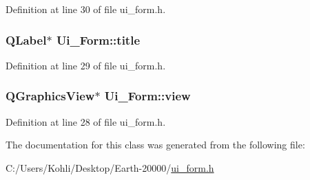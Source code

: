Definition at line 30 of file ui\_\-form.h.\hypertarget{class_ui___form_a01632f0f69b650c6b495e36b16f6922d}{
\subsubsection[{title}]{\setlength{\rightskip}{0pt plus 5cm}QLabel$\ast$ {\bf Ui\_\-Form::title}}}
\label{class_ui___form_a01632f0f69b650c6b495e36b16f6922d}


Definition at line 29 of file ui\_\-form.h.\hypertarget{class_ui___form_a2dd20604b10943cf669cddf4ad73e2d1}{
\subsubsection[{view}]{\setlength{\rightskip}{0pt plus 5cm}QGraphicsView$\ast$ {\bf Ui\_\-Form::view}}}
\label{class_ui___form_a2dd20604b10943cf669cddf4ad73e2d1}


Definition at line 28 of file ui\_\-form.h.

The documentation for this class was generated from the following file:\begin{DoxyCompactItemize}
\item 
C:/Users/Kohli/Desktop/Earth-\/20000/\hyperlink{ui__form_8h}{ui\_\-form.h}\end{DoxyCompactItemize}

